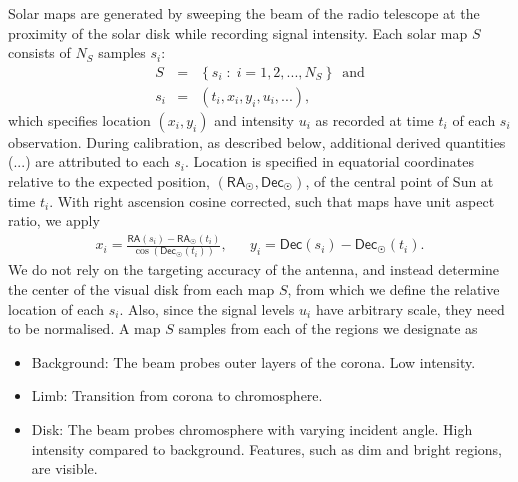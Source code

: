 \documentclass{aa}
\newcommand{\eqnl}[2]{\begin{eqnarray}\label{#1}#2\end{eqnarray}}
\newcommand{\RA}{{\mathsf{RA}}}
\newcommand{\Dec}{{\mathsf{Dec}}}
\begin{document}
  Solar maps are generated by sweeping the beam of the radio telescope at the proximity of the solar disk while recording signal intensity.
  Each solar map $S$ consists of $N_S$ samples $s_i$:
  \eqnl{radio_sample}{
    S &=& \left\{ s_i \;:\; i = 1, 2, ..., N_S \right\}\,\text{ and}\nonumber\\
    s_i &=& \left( t_i, x_i, y_i, u_i, ... \right),
  }
which specifies location $(x_i,y_i)$ and intensity $u_i$ as recorded at time
$t_i$ of each $s_i$ observation.
During calibration, as described below, additional derived quantities ($...$)
are attributed to each $s_i$.
Location is specified in equatorial coordinates relative to the expected
position, $(\RA_{\astrosun}, \Dec_{\astrosun})$, of the central point of Sun
at time $t_i$.
With right ascension cosine corrected, such that maps have unit aspect ratio, we apply 
\eqnl{relative_radec}{
  x_i = \frac{\RA(s_i)
      - \RA_{\astrosun}(t_i)}{\cos \left( \Dec_{\astrosun}(t_i) \right)}, &&
  y_i = \Dec(s_i) - \Dec_{\astrosun}(t_i)\text{.}
  }
  We do not rely on the targeting accuracy of the antenna, and instead
  determine the center of the visual disk from each map $S$, from which we
  define the relative location of each $s_i$.
  Also, since the signal levels $u_i$ have arbitrary scale, 
  they need to be normalised.
  A map $S$ samples from each of the regions we designate as
  \begin{itemize}
  \item Background: The beam probes outer layers of the corona. Low intensity.
  \item Limb: Transition from corona to chromosphere.
  \item Disk: The beam probes chromosphere with varying incident angle. High intensity compared to background. Features, such as dim and bright regions, are visible.
  \end{itemize}
\end{document}

